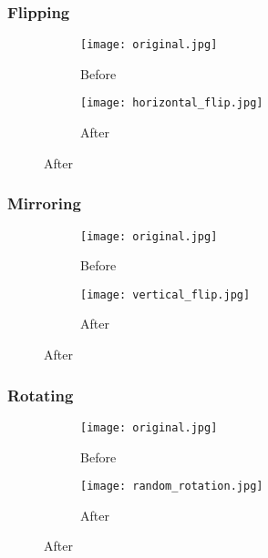 \subsubsection{Flipping}

\begin{figure}[H]
	\centering
	\begin{subfigure}{0.45\textwidth}
		\texttt{[image: original.jpg]}
		\caption{Before}
		\label{fig:original}
	\end{subfigure}
	\hfill
	\begin{subfigure}{0.45\textwidth}
		\texttt{[image: horizontal\_flip.jpg]}
		\caption{After}
		\label{fig:horizontal_flip}
	\end{subfigure}
	\label{fig:comparison}
\end{figure}

\subsubsection{Mirroring}

\begin{figure}[H]
	\centering
	\begin{subfigure}{0.45\textwidth}
		\texttt{[image: original.jpg]}
		\caption{Before}
		\label{fig:original}
	\end{subfigure}
	\hfill
	\begin{subfigure}{0.45\textwidth}
		\texttt{[image: vertical\_flip.jpg]}
		\caption{After}
		\label{fig:horizontal_flip}
	\end{subfigure}
	\label{fig:comparison}
\end{figure}

\newpage

\subsubsection{Rotating}

\begin{figure}[H]
	\centering
	\begin{subfigure}{0.45\textwidth}
		\texttt{[image: original.jpg]}
		\caption{Before}
		\label{fig:original}
	\end{subfigure}
	\hfill
	\begin{subfigure}{0.45\textwidth}
		\texttt{[image: random\_rotation.jpg]}
		\caption{After}
		\label{fig:horizontal_flip}
	\end{subfigure}
	\label{fig:comparison}
\end{figure}


